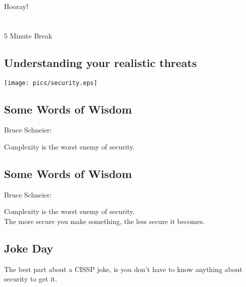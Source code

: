 \documentclass[xga]{xdvislides}
\begin{document}
\newpage
\vspace*{\fill}
\begin{center}
    \Hugesize
        Hooray! \\ [1em]
    \hspace*{5mm}
    \blueline\\
    \hspace*{5mm}\\
        5 Minute Break
\end{center}
\vspace*{\fill}


\subsection{Understanding your realistic threats}
\vspace*{\fill}
\begin{center}
	\texttt{[image: pics/security.eps]}
\end{center}
\vspace*{\fill}


\subsection{Some Words of Wisdom}
Bruce Schneier:
\\

\Huge
\begin{center}
Complexity is the worst enemy of security.
\end{center}
\Normalsize

\subsection{Some Words of Wisdom}
Bruce Schneier:
\\

\Huge
\begin{center}
Complexity is the worst enemy of security.
\\
\addvspace{.5in}
The more secure you make something, the less secure it becomes.
\end{center}
\Normalsize

\subsection{Joke Day}
\vspace*{\fill}
\begin{center}
\Huge
The best part about a CISSP joke, is you don't have to know anything about
security to get it.
\Normalsize
\end{center}
\vspace*{\fill}
\end{document}
